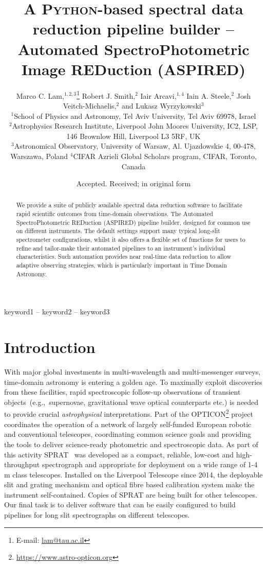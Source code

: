 \documentclass[fleqn,usenatbib]{mnras}
\title[ASPIRED]{A \textsc{Python}-based spectral data reduction pipeline builder --\\
Automated SpectroPhotometric Image REDuction (ASPIRED)}
\author[M. C. Lam et al.]
{Marco C. Lam,$^{1, 2, 3}$\thanks{E-mail: \href{mailto:lam@tau.ac.il}{lam@tau.ac.il}}
Robert J. Smith,$^{2}$
Iair Arcavi,$^{1,4}$
Iain A. Steele,$^{2}$
Josh Veitch-Michaelis,$^{2}$ and
\newauthor Lukasz Wyrzykowski$^{3}$
\\
$^{1}$School of Physics and Astronomy, Tel Aviv University, Tel Aviv 69978, Israel\\
$^{2}$Astrophysics Research Institute, Liverpool John Moores University, IC2, LSP, 146 Brownlow Hill, Liverpool L3 5RF, UK\\
$^{3}$Astronomical Observatory, University of Warsaw, Al. Ujazdowskie 4, 00-478, Warszawa, Poland
$^{4}$CIFAR Azrieli Global Scholars program, CIFAR, Toronto, Canada
}
\date{Accepted. Received; in original form}
\begin{document}
\label{firstpage}
\pagerange{\pageref{firstpage}--\pageref{lastpage}}
\maketitle

\begin{abstract}
We provide a suite of publicly available spectral data reduction software
to facilitate rapid scientific outcomes from time-domain observations. The Automated
SpectroPhotometric REDuction (\textsc{ASPIRED}) pipeline builder, designed for common
use on different instruments. The default settings support many typical long-slit
spectrometer configurations, whilst it also offers a flexible set of functions for
users to refine and tailor-make their automated pipelines to an instrument's
individual characteristics. Such automation provides near real-time data reduction
to allow adaptive observing strategies, which is particularly important in Time
Domain Astronomy.
\end{abstract}

\begin{keywords}
keyword1 -- keyword2 -- keyword3
\end{keywords}



\section{Introduction}
With major global investments in multi-wavelength and multi-messenger surveys, time-domain
astronomy is entering a golden age. To maximally exploit discoveries from these
facilities, rapid spectroscopic follow-up observations of transient objects~(e.g.,\ supernovae,
gravitational wave optical counterparts etc.) is needed to provide crucial {\em astrophysical} 
interpretations. Part of the OPTICON\footnote{\url{https://www.astro-opticon.org}} project
coordinates the operation of a network of largely self-funded European robotic and conventional
telescopes, coordinating common science goals and providing the tools to deliver science-ready
photometric and spectroscopic data. As part of this activity SPRAT~\citep{2014SPIE.9147E..8HP}
was developed as a compact, reliable, low-cost and high-throughput spectrograph and appropriate
for deployment on a wide range of 1-4\,m class telescopes. Installed on the Liverpool Telescope
since 2014, the deployable slit and grating mechanism and optical fibre based calibration
system make the instrument self-contained. Copies of SPRAT are being built for other 
telescopes. Our final task is to deliver software that can be easily configured to build
pipelines for long slit spectrographs on different telescopes.
\end{document}
